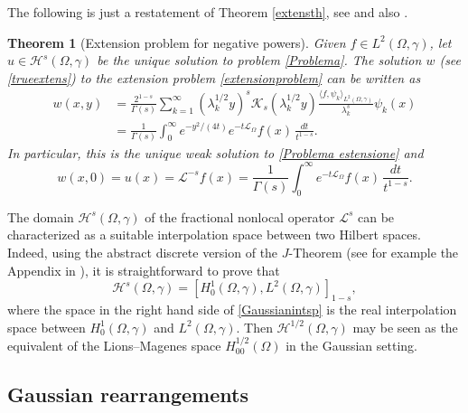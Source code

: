 \documentclass[a4paper,10pt,reqno]{amsart}
\newtheorem{theorem}{Theorem}[section]
\numberwithin{equation}{section}
\begin{document}
The following is just a restatement of Theorem \ref{extensth}, see \cite[Theorem~1.1]{Stinga-Torrea} and
also \cite{Gale-Miana-Stinga}.

\begin{theorem}[Extension problem for negative powers]
\label{existweaksollin}
Given $f\in L^{2}(\Omega,\gamma)$, let $u\in\mathcal{H}^s(\Omega,\gamma)$
be the unique solution to problem \eqref{Problema}.
The solution $w$ (see \eqref{trueextens})
to the extension problem \eqref{extensionproblem} can be written as
\begin{equation}\label{eq:semigroup formula f}
\begin{aligned}
w(x,y) &= \frac{2^{1-s}}{\Gamma(s)}\sum_{k=1}^{\infty}(\lambda_k^{1/2}y)^s\mathcal{K}_s(\lambda_k^{1/2}y)
\frac{\langle f,\psi_{k}\rangle_{L^{2}(\Omega,\gamma)}}{\lambda_k^s}\psi_{k}(x) \\
&= \frac{1}{\Gamma(s)}\int_{0}^{\infty}e^{-y^{2}/(4t)}
e^{-t\mathcal{L}_{\Omega}}f(x)\,\frac{dt}{t^{1-s}}.
\end{aligned}
\end{equation}
In particular, this is the unique weak solution to \eqref{Problema estensione} and
\begin{equation}\label{eq:fractional integral}
w(x,0)=u(x)=\mathcal{L}^{-s}f(x)=\frac{1}{\Gamma(s)}\int_0^\infty e^{-t\mathcal{L}_\Omega}f(x)\,\frac{dt}{t^{1-s}}.
\end{equation}
\end{theorem}

The domain $\mathcal{H}^s(\Omega,\gamma)$ of the fractional nonlocal operator $\mathcal{L}^s$
can be characterized as a suitable interpolation space between two
Hilbert spaces. Indeed, using the abstract discrete version of the $J$-Theorem
(see for example the Appendix in \cite{SirBonfVaz}), it is straightforward to prove that
\begin{equation}
\mathcal{H}^s(\Omega,\gamma)=\left[H_{0}^{1}(\Omega,\gamma),L^{2}%
(\Omega,\gamma)\right] _{1-s},\label{Gaussianintsp}
\end{equation}
where the space in the right hand side of \eqref{Gaussianintsp}
is the real interpolation space between
$H_{0}^{1}(\Omega,\gamma)$ and $L^{2}(\Omega,\gamma)$. Then
$\mathcal{H}^{1/2}(\Omega,\gamma)$ may be seen as the equivalent of the
Lions--Magenes space $H_{00}^{1/2}(\Omega)$ in the Gaussian setting.

\subsection{Gaussian rearrangements}\label{Gaussian rearrangements}
\end{document}
